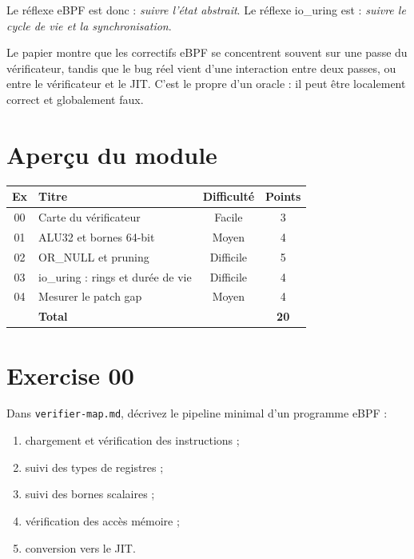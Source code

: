 \documentclass{training}
\begin{document}
Le réflexe eBPF est donc : \emph{suivre l'état abstrait}. Le réflexe
io\_uring est : \emph{suivre le cycle de vie et la synchronisation}.

\begin{info}
Le papier montre que les correctifs eBPF se concentrent souvent sur une
passe du vérificateur, tandis que le bug réel vient d'une interaction entre
deux passes, ou entre le vérificateur et le JIT. C'est le propre d'un
oracle : il peut être localement correct et globalement faux.
\end{info}

\chapter{Aperçu du module}

\begin{center}
\begin{tabularx}{\linewidth}{|c|l|c|c|}
\hline
\textbf{Ex} & \textbf{Titre} & \textbf{Difficulté} & \textbf{Points} \\ \hline
00 & Carte du vérificateur & Facile & 3 \\
01 & ALU32 et bornes 64-bit & Moyen & 4 \\
02 & OR\_NULL et pruning & Difficile & 5 \\
03 & io\_uring : rings et durée de vie & Difficile & 4 \\
04 & Mesurer le patch gap & Moyen & 4 \\ \hline
& \textbf{Total} & & \textbf{20} \\ \hline
\end{tabularx}
\end{center}

\startexercices

\chapter{Exercise 00}
\makeheaderfiles

Dans \texttt{verifier-map.md}, décrivez le pipeline minimal d'un programme
eBPF :

\begin{enumerate}
  \item chargement et vérification des instructions ;
  \item suivi des types de registres ;
  \item suivi des bornes scalaires ;
  \item vérification des accès mémoire ;
  \item conversion vers le JIT.
\end{enumerate}
\end{document}
